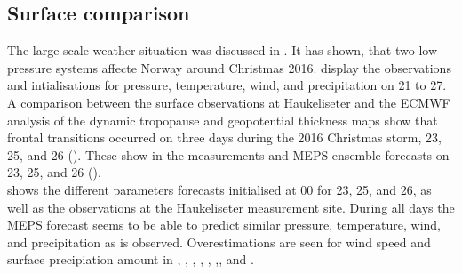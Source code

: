\subsection{Surface comparison}\label{sec:res:large_scale_sfc}
%
The large scale weather situation was discussed in . It has shown, that two low pressure systems affecte Norway around Christmas 2016.  display the observations and intialisations for pressure, temperature, wind, and precipitation on \num{21} to \SI{27}{\dec}. 
\\
A comparison between the surface observations at Haukeliseter and the ECMWF analysis of the dynamic tropopause and geopotential thickness maps show that frontal transitions occurred on three days during the 2016 Christmas storm, \num{23}, \num{25}, and \SI{26}{\dec} (). 
These show in the measurements and MEPS ensemble forecasts on \num{23}, \num{25}, and \SI{26}{\dec} ().
\\
 shows the different parameters forecasts initialised at \SI{00}{\UTC} for \num{23}, \num{25}, and \SI{26}{\dec}, as well as the observations at the Haukeliseter measurement site. During all days the MEPS forecast seems to be able to predict similar pressure, temperature, wind, and precipitation as is observed. Overestimations are seen for wind speed and surface precipiation amount in , , , , , ,, and . 
\\
%
